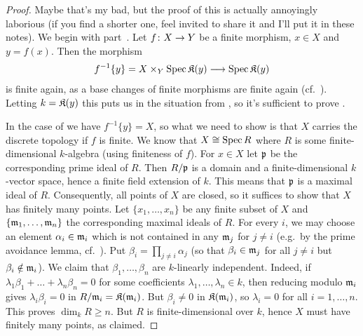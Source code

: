 \documentclass[a4paper,parskip=half,numbers=enddot, DIV=12]{scrreprt}
\renewcommand{\geq}{\geqslant}
\begin{document}
\begin{proof}
	Maybe that's my bad, but the proof of this is actually annoyingly laborious (if you find a shorter one, feel invited to share it and I'll put it in these notes). We begin with part~. Let $f\colon X\morphism Y$ be a finite morphism, $x\in X$ and $y=f(x)$. Then the morphism
	\begin{align*}
		f^{-1}\{y\}=X\times_Y\Spec \KK(y)\morphism \Spec \KK(y)
	\end{align*}
	is finite again, as a base changes of finite morphisms are finite again (cf.\ \cite[Corollary~1.5.1]{alggeo1}). Letting $k=\mathfrak{K}(y)$ this puts us in the situation from , so it's sufficient to prove .
	
	In the case of  we have $f^{-1}\{y\}=X$, so what we need to show is that $X$ carries the discrete topology if $f$ is finite. We know that $X\cong \operatorname{Spec} R$ where $R$ is some finite-dimensional $k$-algebra (using finiteness of $f$). For $x\in X$ let $\mathfrak{p}$ be the corresponding prime ideal of $R$. Then $R/\mathfrak{p}$ is a domain and a finite-dimensional $k$-vector space, hence a finite field extension of $k$. This means that $\mathfrak{p}$ is a maximal ideal of $R$. Consequently, all points of $X$ are closed, so it suffices to show that $X$ has finitely many points. Let $\{x_1,\ldots,x_n\}$ be any finite subset of $X$ and $\{\mathfrak{m}_1,\ldots,\mathfrak{m}_n\}$ the corresponding maximal ideals of $R$. For every $i$, we may choose an element $\alpha_i\in\mathfrak{m}_i$ which is not contained in any $\mathfrak{m}_j$ for $j\neq i$ (e.g.\ by the prime avoidance lemma, cf.\ \cite[Lemma~2.5.1]{alg1}). Put $\beta_i=\prod_{j\neq i}\alpha_j$ (so that $\beta_i\in\mathfrak{m}_j$ for all $j\neq i$ but $\beta_i\notin \mathfrak{m}_i$). We claim that $\beta_1,\ldots,\beta_n$ are $k$-linearly independent. Indeed, if $\lambda_1\beta_1+\ldots+\lambda_n\beta_n=0$ for some coefficients $\lambda_1,\ldots,\lambda_n\in k$, then reducing modulo $\mathfrak{m}_i$ gives $\lambda_i\beta_i=0$ in $R/\mathfrak{m}_i=\mathfrak{K}(\mathfrak{m}_i)$. But $\beta_i\neq 0$ in $\mathfrak{K}(\mathfrak{m}_i)$, so $\lambda_i=0$ for all $i=1,\ldots,n$. This proves $\dim_kR\geq n$. But $R$ is finite-dimensional over $k$, hence $X$ must have finitely many points, as claimed.
	

\end{proof}
\end{document}
